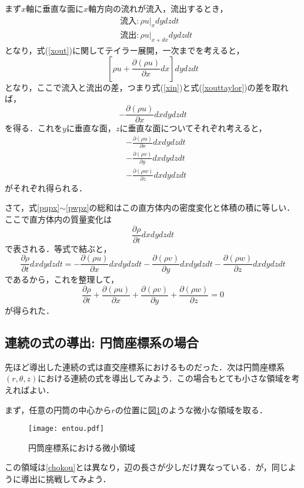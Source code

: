 \documentclass{jsarticle}
\newcommand{\pfrac}[2]{\frac{\partial{}{#1}}{\partial{}{#2}}}
\begin{document}
まず$x$軸に垂直な面に$x$軸方向の流れが流入，流出するとき，
\begin{align}
  &流入:\rho{}u|_{x}dydzdt\label{xin}\\
  &流出:\rho{}u|_{x+dx}dydzdt\label{xout}
\end{align}
となり，式(\ref{xout})に関してテイラー展開，一次までを考えると，
\begin{equation}
  \left[\rho{}u+\pfrac{(\rho{}u)}{x}dx\right]dydzdt\label{xouttaylor}
\end{equation}
となり，ここで流入と流出の差，つまり式(\ref{xin})と式(\ref{xouttaylor})の差を取れば，
\begin{equation}
  -\pfrac{(\rho{}u)}{x}dxdydzdt
\end{equation}
を得る．これを$y$に垂直な面，$z$に垂直な面についてそれぞれ考えると，
\begin{align}
  &-\pfrac{(\rho{}u)}{x}dxdydzdt\label{pupx}\\
  &-\pfrac{(\rho{}v)}{y}dxdydzdt\label{pvpy}\\
  &-\pfrac{(\rho{}w)}{z}dxdydzdt\label{pwpz}
\end{align}
がそれぞれ得られる．

さて，式\ref{pupx}$\sim$\ref{pwpz}の総和はこの直方体内の密度変化と体積の積に等しい．ここで直方体内の質量変化は
\begin{equation}
  \pfrac{\rho}{t}dxdydzdt
\end{equation}
で表される．等式で結ぶと，
\begin{equation}
  \pfrac{\rho}{t}dxdydzdt=-\pfrac{(\rho{}u)}{x}dxdydzdt-\pfrac{(\rho{}v)}{y}dxdydzdt-\pfrac{(\rho{}w)}{z}dxdydzdt
\end{equation}
であるから，これを整理して，
\begin{equation}
  \pfrac{\rho}{t}+\pfrac{(\rho{}u)}{x}+\pfrac{(\rho{}v)}{y}+\pfrac{(\rho{}w)}{z}=0
\end{equation}
が得られた．

\subsection{連続の式の導出: 円筒座標系の場合}
先ほど導出した連続の式は直交座標系におけるものだった．次は円筒座標系$(r, \theta, z)$における連続の式を導出してみよう．この場合もとても小さな領域を考えればよい．

まず，任意の円筒の中心から$r$の位置に図\ref{entou}のような微小な領域を取る．
\begin{figure}
  \centering
  \texttt{[image: entou.pdf]}
  \caption{円筒座標系における微小領域}
  \label{entou}
\end{figure}
この領域は\ref{chokou}とは異なり，辺の長さが少しだけ異なっている．が，同じように導出に挑戦してみよう．
\end{document}
